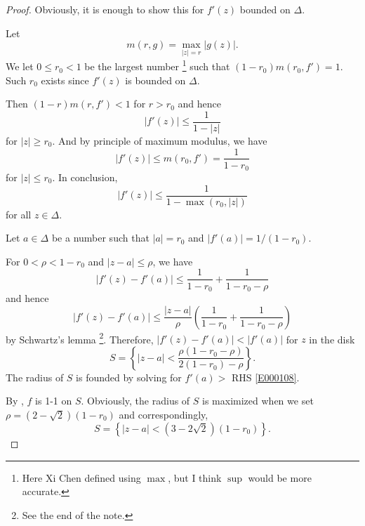 \documentclass[11pt]{amsart}
\theoremstyle{remark}
\theoremstyle{definition}
\numberwithin{equation}{section}
\begin{document}
\begin{proof}
    Obviously, it is enough to show this for $f'(z)$ bounded on $\Delta$.

    Let
    \begin{equation}\label{E000103}
        m(r, g) = \max_{|z| = r} |g(z)|.
    \end{equation}
    We let $0\le r_0 < 1$ be the largest number \footnote[1]{Here Xi Chen defined using $\max$, but I think $\sup$ would be more accurate.} such that $(1-r_0) m(r_0, f') = 1$.
    Such $r_0$ exists since $f'(z)$ is bounded on $\Delta$.

    Then
    $(1-r) m(r, f') < 1$ for $r > r_0$ and hence
    \begin{equation}\label{E000104}
        |f'(z)| \le \frac{1}{1 - |z|}
    \end{equation}
    for $|z| \ge r_0$. And by principle of maximum modulus, we have
    \begin{equation}\label{E000105}
        |f'(z)| \le m(r_0, f') = \frac{1}{1 - r_0}
    \end{equation}
    for $|z| \le r_0$. In conclusion,
    \begin{equation}\label{E000106}
        |f'(z)| \le \frac{1}{1 - \max(r_0, |z|)}
    \end{equation}
    for all $z\in \Delta$.

    Let $a\in \Delta$ be a number such that $|a| = r_0$ and $|f'(a)| = 1/(1-r_0)$.

    For $0 < \rho < 1-r_0$ and $|z - a| \le \rho$, we have
    \begin{equation}\label{E000107}
        |f'(z) - f'(a)| \le \frac{1}{1 - r_0} + \frac{1}{1 - r_0 - \rho}
    \end{equation}
    and hence
    \begin{equation}\label{E000108}
        |f'(z) - f'(a)| \le \frac{|z - a|}{\rho}
        \left(\frac{1}{1 - r_0} + \frac{1}{1 - r_0 - \rho}\right)
    \end{equation}
    by Schwartz's lemma \footnote[2]{See the end of the note.}. Therefore,
    $|f'(z) - f'(a)| < |f'(a)|$ for $z$ in the disk
    \begin{equation}\label{E000110}
        S = \left\{|z - a| < \frac{\rho(1-r_0-\rho)}{2(1-r_0) - \rho}\right\}.
    \end{equation}
    The radius of $S$ is founded by solving for $f'(a)>$ RHS \ref{E000108}.

    By , $f$ is 1-1 on $S$. Obviously, the radius of $S$ is maximized when we set
    $\rho = (2-\sqrt{2})(1-r_0)$ and correspondingly,
    \begin{equation}\label{E000111}
        S = \left\{|z-a| < (3-2\sqrt{2})(1 - r_0)\right\}.
    \end{equation}


\end{proof}
\end{document}
